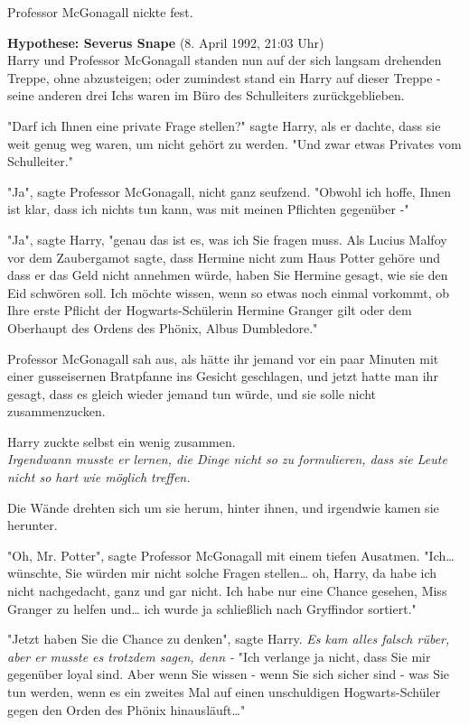 {Professor McGonagall nickte fest.

\textbf{Hypothese: Severus Snape} (8. April 1992, 21:03 Uhr)\\ Harry und Professor McGonagall standen nun auf der sich langsam drehenden Treppe, ohne abzusteigen; oder zumindest stand ein Harry auf dieser Treppe - seine anderen drei Ichs waren im Büro des Schulleiters zurückgeblieben.

"Darf ich Ihnen eine private Frage stellen?" sagte Harry, als er dachte, dass sie weit genug weg waren, um nicht gehört zu werden. "Und zwar etwas Privates vom Schulleiter."

"Ja", sagte Professor McGonagall, nicht ganz seufzend. "Obwohl ich hoffe, Ihnen ist klar, dass ich nichts tun kann, was mit meinen Pflichten gegenüber -"

"Ja", sagte Harry, "genau das ist es, was ich Sie fragen muss. Als Lucius Malfoy vor dem Zaubergamot sagte, dass Hermine nicht zum Haus Potter gehöre und dass er das Geld nicht annehmen würde, haben Sie Hermine gesagt, wie sie den Eid schwören soll. Ich möchte wissen, wenn so etwas noch einmal vorkommt, ob Ihre erste Pflicht der Hogwarts-Schülerin Hermine Granger gilt oder dem Oberhaupt des Ordens des Phönix, Albus Dumbledore."

Professor McGonagall sah aus, als hätte ihr jemand vor ein paar Minuten mit einer gusseisernen Bratpfanne ins Gesicht geschlagen, und jetzt hatte man ihr gesagt, dass es gleich wieder jemand tun würde, und sie solle nicht zusammenzucken.

Harry zuckte selbst ein wenig zusammen.\\ \emph{Irgendwann musste er lernen, die Dinge nicht so zu formulieren, dass sie Leute nicht so hart wie möglich treffen.}

Die Wände drehten sich um sie herum, hinter ihnen, und irgendwie kamen sie herunter.

"Oh, Mr. Potter", sagte Professor McGonagall mit einem tiefen Ausatmen. "Ich… wünschte, Sie würden mir nicht solche Fragen stellen… oh, Harry, da habe ich nicht nachgedacht, ganz und gar nicht. Ich habe nur eine Chance gesehen, Miss Granger zu helfen und… ich wurde ja schließlich nach Gryffindor sortiert."

"Jetzt haben Sie die Chance zu denken", sagte Harry. \emph{Es kam alles falsch rüber, aber er musste es trotzdem sagen, denn -} "Ich verlange ja nicht, dass Sie mir gegenüber loyal sind. Aber wenn Sie wissen - wenn Sie sich sicher sind - was Sie tun werden, wenn es ein zweites Mal auf einen unschuldigen Hogwarts-Schüler gegen den Orden des Phönix hinausläuft…"

}
